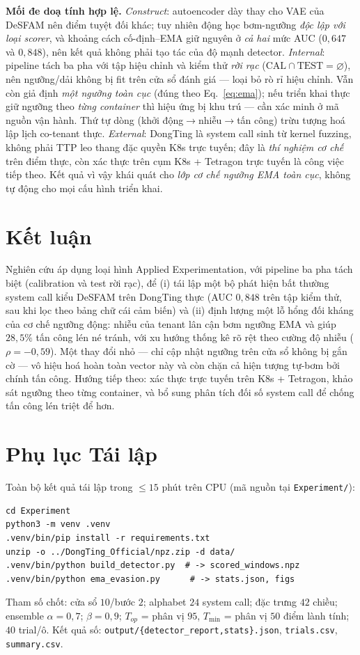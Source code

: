 \documentclass[conference,10pt]{IEEEtran}
\begin{document}
\textbf{Mối đe doạ tính hợp lệ.}
\textit{Construct}: autoencoder dày thay cho VAE của DeSFAM nên điểm tuyệt đối khác; tuy nhiên động học bơm-ngưỡng \textit{độc lập với loại scorer}, và khoảng cách cố-định--EMA giữ nguyên ở \textit{cả hai} mức AUC ($0{,}647$ và $0{,}848$), nên kết quả không phải tạo tác của độ mạnh detector.
\textit{Internal}: pipeline tách ba pha với tập hiệu chỉnh và kiểm thử \textit{rời rạc} ($\text{CAL}\cap\text{TEST}=\varnothing$), nên ngưỡng/dải không bị fit trên cửa sổ đánh giá — loại bỏ rò rỉ hiệu chỉnh. Vẫn còn giả định \textit{một ngưỡng toàn cục} (đúng theo Eq.~\eqref{eq:ema}); nếu triển khai thực giữ ngưỡng theo \textit{từng container} thì hiệu ứng bị khu trú — cần xác minh ở mã nguồn vận hành. Thứ tự dòng (khởi động$\to$nhiễu$\to$tấn công) trừu tượng hoá lập lịch co-tenant thực.
\textit{External}: DongTing là system call sinh từ kernel fuzzing, không phải TTP leo thang đặc quyền K8s trực tuyến; đây là \textit{thí nghiệm cơ chế} trên điểm thực, còn xác thực trên cụm K8s + Tetragon trực tuyến là công việc tiếp theo. Kết quả vì vậy khái quát cho \textit{lớp cơ chế ngưỡng EMA toàn cục}, không tự động cho mọi cấu hình triển khai.

\section{Kết luận}
Nghiên cứu áp dụng loại hình Applied Experimentation, với pipeline ba pha tách biệt (calibration và test rời rạc), để (i) tái lập một bộ phát hiện bất thường system call kiểu DeSFAM trên DongTing thực (AUC $0{,}848$ trên tập kiểm thử, sau khi lọc theo bảng chữ cái cảm biến) và (ii) định lượng một lỗ hổng đối kháng của cơ chế ngưỡng động: nhiễu của tenant lân cận bơm ngưỡng EMA và giúp $28{,}5\%$ tấn công lén né tránh, với xu hướng thống kê rõ rệt theo cường độ nhiễu ($\rho=-0{,}59$). Một thay đổi nhỏ — chỉ cập nhật ngưỡng trên cửa sổ không bị gắn cờ — vô hiệu hoá hoàn toàn vector này và còn chặn cả hiện tượng tự-bơm bởi chính tấn công. Hướng tiếp theo: xác thực trực tuyến trên K8s + Tetragon, khảo sát ngưỡng theo từng container, và bổ sung phân tích đối số system call để chống tấn công lén triệt để hơn.




\appendices
\section{Phụ lục Tái lập}\label{sec:repro}
Toàn bộ kết quả tái lập trong $\le 15$ phút trên CPU (mã nguồn tại \texttt{Experiment/}):
\begin{verbatim}
cd Experiment
python3 -m venv .venv
.venv/bin/pip install -r requirements.txt
unzip -o ../DongTing_Official/npz.zip -d data/
.venv/bin/python build_detector.py  # -> scored_windows.npz
.venv/bin/python ema_evasion.py      # -> stats.json, figs
\end{verbatim}
Tham số chốt: cửa sổ $10$/bước $2$; alphabet $24$ system call; đặc trưng $42$ chiều; ensemble $\alpha=0{,}7$; $\beta=0{,}9$; $T_{op}$ = phân vị $95$, $T_{\min}$ = phân vị $50$ điểm lành tính; $40$ trial/ô. Kết quả số: \texttt{output/\{detector\_report,stats\}.json}, \texttt{trials.csv}, \texttt{summary.csv}.
\end{document}
